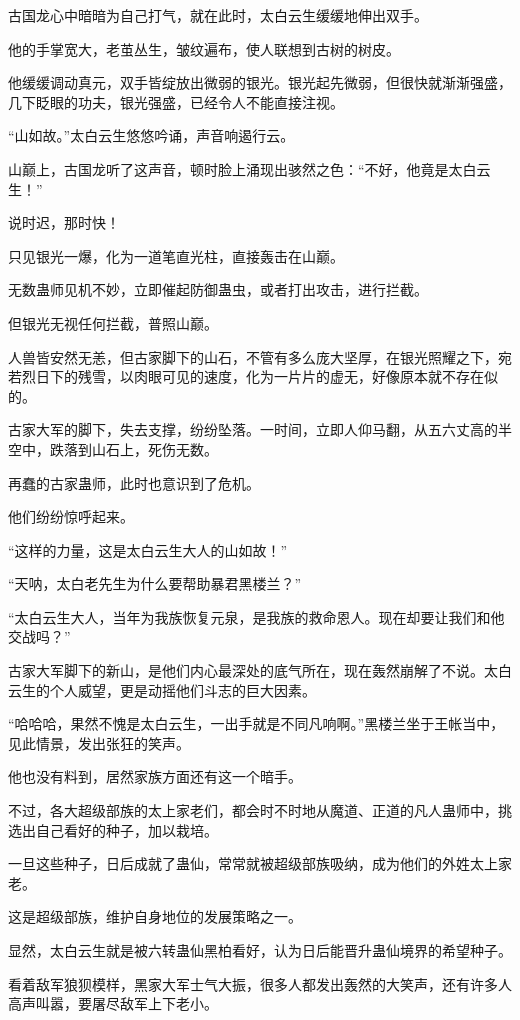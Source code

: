 \begin{this_body}
古国龙心中暗暗为自己打气，就在此时，太白云生缓缓地伸出双手。

他的手掌宽大，老茧丛生，皱纹遍布，使人联想到古树的树皮。

他缓缓调动真元，双手皆绽放出微弱的银光。银光起先微弱，但很快就渐渐强盛，几下眨眼的功夫，银光强盛，已经令人不能直接注视。

“山如故。”太白云生悠悠吟诵，声音响遏行云。

山巅上，古国龙听了这声音，顿时脸上涌现出骇然之色：“不好，他竟是太白云生！”

说时迟，那时快！

只见银光一爆，化为一道笔直光柱，直接轰击在山巅。

无数蛊师见机不妙，立即催起防御蛊虫，或者打出攻击，进行拦截。

但银光无视任何拦截，普照山巅。

人兽皆安然无恙，但古家脚下的山石，不管有多么庞大坚厚，在银光照耀之下，宛若烈日下的残雪，以肉眼可见的速度，化为一片片的虚无，好像原本就不存在似的。

古家大军的脚下，失去支撑，纷纷坠落。一时间，立即人仰马翻，从五六丈高的半空中，跌落到山石上，死伤无数。

再蠢的古家蛊师，此时也意识到了危机。

他们纷纷惊呼起来。

“这样的力量，这是太白云生大人的山如故！”

“天呐，太白老先生为什么要帮助暴君黑楼兰？”

“太白云生大人，当年为我族恢复元泉，是我族的救命恩人。现在却要让我们和他交战吗？”

古家大军脚下的新山，是他们内心最深处的底气所在，现在轰然崩解了不说。太白云生的个人威望，更是动摇他们斗志的巨大因素。

“哈哈哈，果然不愧是太白云生，一出手就是不同凡响啊。”黑楼兰坐于王帐当中，见此情景，发出张狂的笑声。

他也没有料到，居然家族方面还有这一个暗手。

不过，各大超级部族的太上家老们，都会时不时地从魔道、正道的凡人蛊师中，挑选出自己看好的种子，加以栽培。

一旦这些种子，日后成就了蛊仙，常常就被超级部族吸纳，成为他们的外姓太上家老。

这是超级部族，维护自身地位的发展策略之一。

显然，太白云生就是被六转蛊仙黑柏看好，认为日后能晋升蛊仙境界的希望种子。

看着敌军狼狈模样，黑家大军士气大振，很多人都发出轰然的大笑声，还有许多人高声叫嚣，要屠尽敌军上下老小。


\end{this_body}
